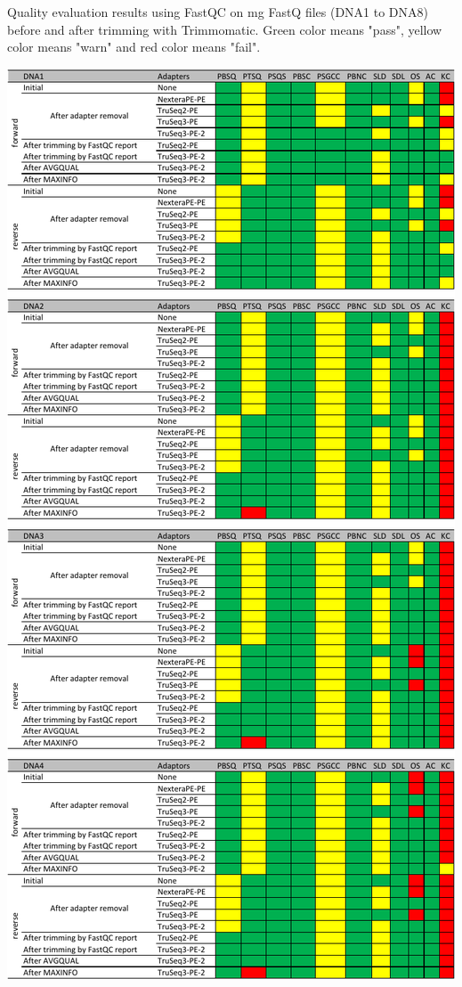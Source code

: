 \documentclass[
  oneside,
  11pt, a4paper,
  footinclude=true,
  headinclude=true,
  cleardoublepage=empty
]{scrbook}
\begin{document}
    \begin{table}[ph!]    
    \caption{Quality evaluation results \tnote{*}  using FastQC on \gls{mg} FastQ files (DNA1 to DNA8) before and after trimming with Trimmomatic. Green color means "pass", yellow color means "warn" and red color means "fail".}
    \includegraphics[width=\columnwidth,height=\textheight]{FiguresUndTables/Results/Preprocessing/fastqcdna1234.pdf}

\end{table}
\end{document}
